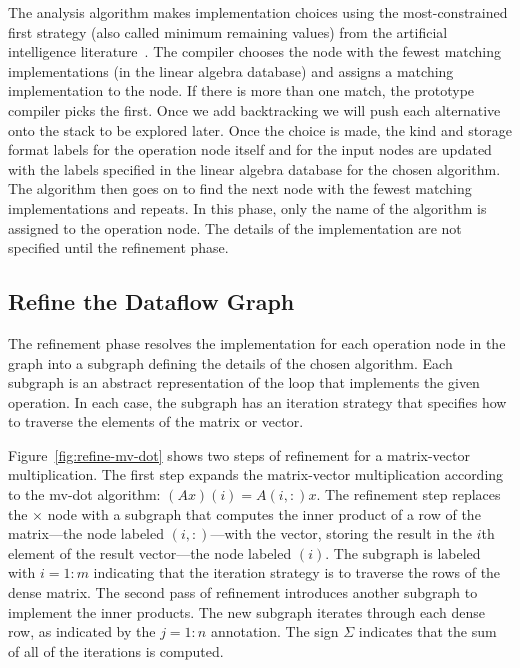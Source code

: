 \documentclass[runningheads]{llncs}
\begin{document}
The analysis algorithm makes implementation choices using the most-constrained first strategy (also called minimum remaining values)
from the artificial intelligence literature~\cite{Russell:2003mz}.
The compiler chooses the node with the fewest matching implementations (in the linear algebra database) and assigns a matching implementation to the node.  If there is more than one match, the prototype compiler picks the first.  Once we add backtracking we will push each alternative onto the stack to be explored later. Once the choice is made, the kind and storage format labels for the operation node itself and for the input nodes are updated with the labels specified in the linear algebra database for the chosen algorithm. The algorithm then goes on to find the next node with the fewest matching implementations and repeats.  In this phase, only the name of the algorithm is assigned to the operation node.  The details of the implementation are not specified until the refinement phase.


\subsection{Refine the Dataflow Graph}
\label{sec:refine}

The refinement phase resolves the implementation for each operation node in the graph into a subgraph defining the details of the chosen algorithm.  Each subgraph is an abstract representation of the loop that implements the given operation.  In each case, the subgraph has an iteration strategy that specifies how to traverse the elements of the matrix or vector.

Figure~\ref{fig:refine-mv-dot} shows two steps of refinement for a matrix-vector multiplication. The first step expands the matrix-vector multiplication according to the mv-dot algorithm: $(Ax)(i) = A(i,:)x$.  The refinement step replaces the $\times$ node with a subgraph that computes the inner product of a row of the matrix---the node labeled $(i,:)$---with the vector, storing the result in the $i$th element of the result vector---the node labeled $(i)$. The subgraph is labeled with $i=1\!:\!m$ indicating that the iteration strategy is to traverse the rows of the dense matrix.
%
The second pass of refinement introduces another subgraph to implement the inner products. The new subgraph iterates through each dense row, as indicated by the $j=1:n$ annotation. The sign $\Sigma$ indicates that the sum of all of the iterations is computed.
\end{document}
